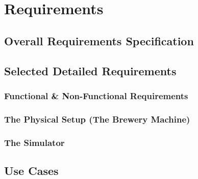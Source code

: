 \section{Requirements}

\subsection{Overall Requirements Specification}

\subsection{Selected Detailed Requirements}

\subsubsection{Functional \& Non-Functional Requirements}

\subsubsection{The Physical Setup (The Brewery Machine)}

\subsubsection{The Simulator}


\subsection{Use Cases}


